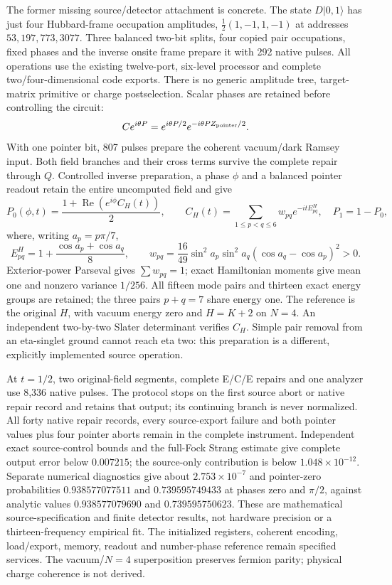 The former missing source/detector attachment is concrete.
The state $D|0,1\rangle$ has just four Hubbard-frame occupation
amplitudes, $\tfrac12(1,-1,1,-1)$ at addresses $53,197,773,3077$.
Three balanced two-bit splits, four copied pair occupations, fixed
phases and the inverse onsite frame prepare it with 292 native pulses.
All operations use the existing twelve-port, six-level processor and
complete two/four-dimensional code exports.  There is no generic
amplitude tree, target-matrix primitive or charge postselection.
Scalar phases are retained before controlling the circuit:
\[
 C e^{i\theta P}=e^{i\theta P/2}e^{-i\theta PZ_{\rm pointer}/2}.
\]
With one pointer bit, 807 pulses prepare the coherent vacuum/dark
Ramsey input.  Both field branches and their cross terms survive the
complete repair through $Q$.  Controlled inverse preparation, a phase
$\phi$ and a balanced pointer readout retain the entire uncomputed
field and give
\[
 P_0(\phi,t)=\frac{1+\operatorname{Re}(e^{i\phi}C_H(t))}{2},\qquad
 C_H(t)=\sum_{1\le p<q\le6}w_{pq}e^{-itE^H_{pq}},\quad P_1=1-P_0,
\]
where, writing $a_p=p\pi/7$,
\[
 E^H_{pq}=1+\frac{\cos a_p+\cos a_q}{8},\qquad
 w_{pq}=\frac{16}{49}\sin^2a_p\sin^2a_q(\cos a_q-\cos a_p)^2>0.
\]
Exterior-power Parseval gives $\sum w_{pq}=1$; exact Hamiltonian moments
give mean one and nonzero variance $1/256$.  All fifteen mode
pairs and thirteen exact energy groups are retained; the three pairs
$p+q=7$ share energy one.  The reference is the original $H$, with
vacuum energy zero and $H=K+2$ on $N=4$.  An independent two-by-two
Slater determinant verifies $C_H$.  Simple pair removal from an
eta-singlet ground cannot reach eta two: this preparation is a
different, explicitly implemented source operation.

At $t=1/2$, two original-field segments, complete E/C/E repairs and
one analyzer use 8,336 native pulses.  The protocol stops on the first
source abort or native repair record and retains that output; its
continuing branch is never normalized.  All forty native repair
records, every source-export failure and both pointer values plus four
pointer aborts remain in the complete instrument.  Independent exact
source-control bounds and the full-Fock Strang estimate give complete
output error below $0.007215$; the source-only contribution is below
$1.048\times10^{-12}$.  Separate numerical diagnostics give about
$2.753\times10^{-7}$ and pointer-zero probabilities
$0.938577077511$ and $0.739595749433$ at phases zero and $\pi/2$,
against analytic values $0.938577079690$ and $0.739595750623$.
These are mathematical source-specification and finite detector results,
not hardware precision or a thirteen-frequency empirical fit.  The
initialized registers, coherent encoding, load/export, memory, readout
and number-phase reference remain specified services.  The vacuum/$N=4$
superposition preserves fermion parity; physical charge coherence is
not derived.

